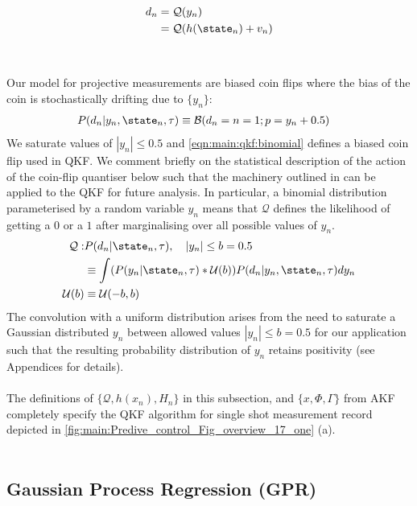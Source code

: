 \begin{align}
d_n &= \mathcal{Q}(y_n)\\
&=  \mathcal{Q}(h(\state_n) + v_n)
\end{align}
\\
\\ 
Our model for projective measurements are biased coin flips where the bias of the coin is stochastically drifting due to $\{ y_n\}$:
\begin{align}
P(d_n | y_n, \state_{n}, \tau) & \equiv \mathcal{B}(d_n=n=1;p= y_n + 0.5 ) \label{eqn:main:qkf:binomial}
\end{align}
We saturate values of $|y_n| \leq 0.5$ and \cref{eqn:main:qkf:binomial} defines a biased coin flip used in QKF. We comment briefly on the statistical description of the action of the coin-flip quantiser below such that the machinery outlined in \cite{karlsson2005} can be applied to the QKF for future analysis. In particular, a binomial distribution parameterised by a random variable $y_n$ means that $\mathcal{Q}$ defines the likelihood of getting a $0$ or a $1$ after marginalising over all possible values of $y_n$.  
\begin{align}
\mathcal{Q}: & P(d_n | \state_{n}, \tau), \quad |y_n| \leq b = 0.5\\
& \equiv  \int (P(y_n | \state_{n}, \tau) * \mathcal{U}(b) ) P(d_n | y_n, \state_{n}, \tau) dy_n \\
\mathcal{U}(b) & \equiv \mathcal{U}(-b, b)
\end{align}
The convolution with a uniform distribution arises from the need to saturate a Gaussian distributed  $y_n$ between allowed values $|y_n| \leq b = 0.5$ for our application such that the resulting probability distribution of $y_n$ retains positivity (see Appendices for details). 
\\
\\
The definitions of $\{ \mathcal{Q}, h(x_n), H_n \}$ in this subsection, and $\{x, \Phi, \Gamma\}$ from AKF completely specify the QKF algorithm for single shot measurement record depicted in \cref{fig:main:Predive_control_Fig_overview_17_one} (a).  
\\
\\
\subsection{Gaussian Process Regression (GPR)}

